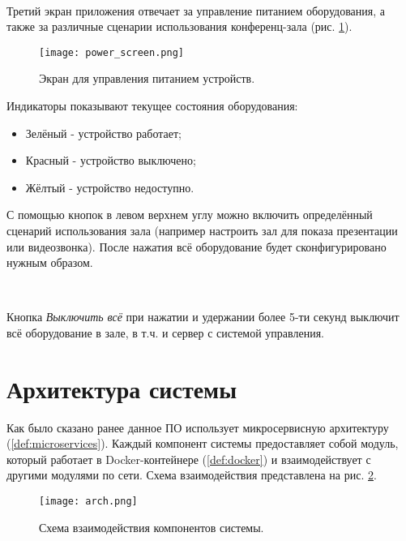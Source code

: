 ~\

\noindent Третий экран приложения отвечает за управление питанием оборудования, а также за различные сценарии использования
конференц-зала (рис. \ref{fig:power_screen}).

\begin{figure}[h]
    \centering
    \texttt{[image: power\_screen.png]}
    \caption{Экран для управления питанием устройств.}
    \label{fig:power_screen}
\end{figure}

\noindent Индикаторы показывают текущее состояния оборудования:

\begin{itemize}
    \item Зелёный - устройство работает;
    \item Красный - устройство выключено;
    \item Жёлтый - устройство недоступно.
\end{itemize}

\noindent С помощью кнопок в левом верхнем углу можно включить определённый сценарий
использования зала (например настроить зал для показа презентации или видеозвонка). После нажатия всё оборудование
будет сконфигурировано нужным образом.

~\

\noindent Кнопка \textit{Выключить всё} при нажатии и удержании более 5-ти секунд выключит всё оборудование в зале, в т.ч.
и сервер с системой управления.

\clearpage

\section{Архитектура системы}

Как было сказано ранее данное ПО использует микросервисную архитектуру (\ref{def:microservices}). Каждый компонент системы
предоставляет собой модуль, который работает в Docker-контейнере (\ref{def:docker}) и взаимодействует с другими модулями
по сети. Схема взаимодействия представлена на рис. \ref{fig:arch}.

\begin{figure}[h]
    \centering
    \texttt{[image: arch.png]}
    \caption{Схема взаимодействия компонентов системы.}
    \label{fig:arch}
\end{figure}


